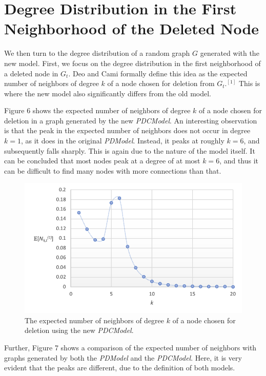 \documentclass[final,3p,times,twocolumn]{elsarticle}
\begin{document}
\section{Degree Distribution in the First Neighborhood of the Deleted Node}
\label{S:7}

We then turn to the degree distribution of a random graph $G$ generated with the new model. First, we focus on the degree distribution in the first neighborhood of a deleted node in $G_t$. Deo and Cami formally define this idea as the expected number of neighbors of degree $k$ of a node chosen for deletion from $G_t$.$^{[1]}$ This is where the new model also significantly differs from the old model.

Figure 6 shows the expected number of neighbors of degree $k$ of a node chosen for deletion in a graph generated by the new \textit{PDCModel}. An interesting observation is that the peak in the expected number of neighbors does not occur in degree $k = 1$, as it does in the original \textit{PDModel}. Instead, it peaks at roughly $k = 6$, and subsequently falls sharply. This is again due to the nature of the model itself. It can be concluded that most nodes peak at a degree of at most $k = 6$, and thus it can be difficult to find many nodes with more connections than that.

\begin{figure}[h]
\centering\includegraphics[width=1\linewidth]{degree-distribution.png}
\caption{The expected number of neighbors of degree $k$ of a node chosen for deletion using the new \textit{PDCModel}.}
\end{figure}

Further, Figure 7 shows a comparison of the expected number of neighbors with graphs generated by both the \textit{PDModel} and the \textit{PDCModel}. Here, it is very evident that the peaks are different, due to the definition of both models.
\end{document}
